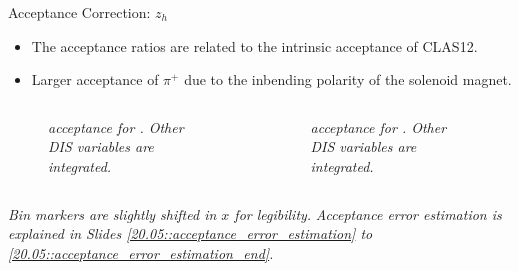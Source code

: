 \begin{frame}{Acceptance Correction: $z_h$}
    \label{11.54::zh}

    \begin{itemize}
        \item
            The acceptance ratios are related to the intrinsic  acceptance of CLAS12.

        \vspace{6pt}
        \item
            Larger acceptance of $\pi^+$ due to the inbending polarity of the solenoid magnet.
    \end{itemize}

    \vspace{-12pt}
    \begin{columns}
        \begin{column}{.49\linewidth}
            \begin{center}
                \begin{figure}[t]
                    \scriptsize{\textit{
                         acceptance for \ef{$\pi^-$}.
                        Other DIS variables are integrated.
                    }}
                \end{figure}
            \end{center}
        \end{column}

        \begin{column}{.49\linewidth}
            \begin{center}
                \begin{figure}[t]
                    \scriptsize{\textit{
                         acceptance for \ef{$\pi^+$}.
                        Other DIS variables are integrated.
                    }}
                \end{figure}
            \end{center}
        \end{column}
    \end{columns}

    \begin{flushright}
        \tiny{\textit{Bin markers are slightly shifted in $x$ for legibility.}}
        \tiny{\textit{Acceptance error estimation is explained in Slides \textcolor{efd_purple}{\ref{20.05::acceptance_error_estimation}} to \textcolor{efd_purple}{\ref{20.05::acceptance_error_estimation_end}}.}}
    \end{flushright}
\end{frame}

